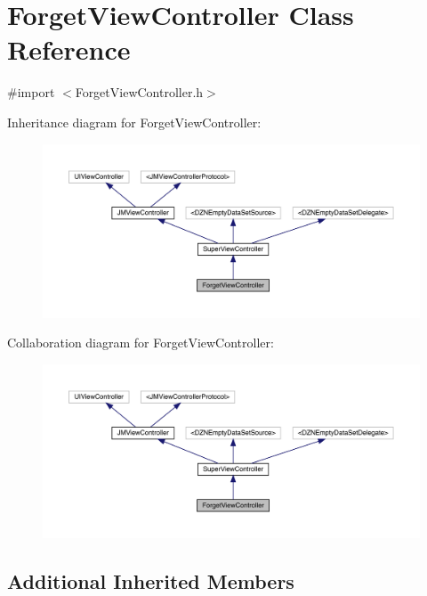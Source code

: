 \hypertarget{interface_forget_view_controller}{}\section{Forget\+View\+Controller Class Reference}
\label{interface_forget_view_controller}


{\ttfamily \#import $<$Forget\+View\+Controller.\+h$>$}



Inheritance diagram for Forget\+View\+Controller\+:\nopagebreak
\begin{figure}[H]
\begin{center}
\leavevmode
\includegraphics[width=350pt]{interface_forget_view_controller__inherit__graph}
\end{center}
\end{figure}


Collaboration diagram for Forget\+View\+Controller\+:\nopagebreak
\begin{figure}[H]
\begin{center}
\leavevmode
\includegraphics[width=350pt]{interface_forget_view_controller__coll__graph}
\end{center}
\end{figure}
\subsection*{Additional Inherited Members}


